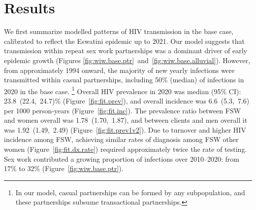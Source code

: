 \section{Results}\label{art.res}
We first summarize modelled patterns of HIV transmission in the base case,
calibrated to reflect the Eswatini epidemic up to 2021.
Our model suggests that transmission within repeat sex work partnerships
was a dominant driver of early epidemic growth
(Figures \ref{fig:wiw.base.ptr}~and~\ref{fig:wiw.base.alluvial}).
However, from approximately 1994 onward,
the majority of new yearly infections were transmitted within casual partnerships, %
including 50\% (median) of infections in 2020 in the base case.%
\footnote{In our model, casual partnerships can be formed by any subpopulation,
  and these partnerships subsume transactional partnerships.}
Overall HIV prevalence in 2020 was median (95\% CI):
23.8~(22.4,~24.7)\% (Figure~\ref{fig:fit.prev}), %
and overall incidence was 6.6~(5.3,~7.6) per 1000 person-years (Figure~\ref{fig:fit.inc}).
The prevalence ratio between FSW and women overall was 1.78~(1.70,~1.87), %
and between clients and men overall it was 1.92~(1.49,~2.49) %
(Figure~\ref{fig:fit.prev1v2}).
Due to turnover and higher HIV incidence among FSW,
achieving similar rates of diagnosis among FSW \vs other women (Figure~\ref{fig:fit.dx.rate})
required approximately twice the rate of testing. %
Sex work contributed a growing proportion of infections
over 2010--2020: from 17\% to 32\% (Figure~\ref{fig:wiw.base.ptr}). %
